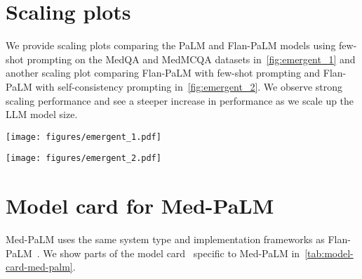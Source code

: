 \section{Scaling plots}
\label{appendix:scaling-plots}
We provide scaling plots comparing the PaLM and Flan-PaLM models using few-shot prompting on the MedQA and MedMCQA datasets in~\cref{fig:emergent_1} and another scaling plot comparing Flan-PaLM with few-shot prompting and Flan-PaLM with self-consistency prompting in~\cref{fig:emergent_2}. We observe strong scaling performance and see a steeper increase in performance as we scale up the LLM model size.

\begin{figure*}[t]
\small
    \centering
    \texttt{[image: figures/emergent\_1.pdf]}
    \vspace{0pt}
    \caption{\textbf{Scaling plots for PaLM and Flan-PaLM with few-shot prompting on MedQA and MedMCQA}}
    \vspace{-0pt}
    \label{fig:emergent_1}
\end{figure*}


\begin{figure*}[t]
\small
    \centering
    \texttt{[image: figures/emergent\_2.pdf]}
    \vspace{0pt}
    \caption{\textbf{Scaling plots for Flan-PaLM with few-shot and Flan-PaLM few-shot + chain-of-thought (CoT) + self-consistency (SC) on MedQA and MedMCQA}}
    \vspace{-0pt}
    \label{fig:emergent_2}
\end{figure*}


\section{Model card for Med-PaLM}
\label{appendix:medpalm-model-card}
Med-PaLM uses the same system type and implementation frameworks as Flan-PaLM~\cite{chung2022scaling}. We show parts of the model card~\cite{mitchell2019model} specific to Med-PaLM in~\cref{tab:model-card-med-palm}.


